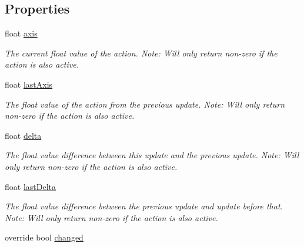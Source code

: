 \subsection*{Properties}
\begin{DoxyCompactItemize}
\item 
float \mbox{\hyperlink{class_valve_1_1_v_r_1_1_steam_v_r___action___single___source_aaf180ef56eea1ec5cf9ec08d87365312}{axis}}
\begin{DoxyCompactList}\small\item\em The current float value of the action. Note\+: Will only return non-\/zero if the action is also active. \end{DoxyCompactList}\item 
float \mbox{\hyperlink{class_valve_1_1_v_r_1_1_steam_v_r___action___single___source_a8bf67221f2e4d862277131972d0ecd69}{last\+Axis}}
\begin{DoxyCompactList}\small\item\em The float value of the action from the previous update. Note\+: Will only return non-\/zero if the action is also active. \end{DoxyCompactList}\item 
float \mbox{\hyperlink{class_valve_1_1_v_r_1_1_steam_v_r___action___single___source_a611617683e15ab0a8bba6de8a637c852}{delta}}
\begin{DoxyCompactList}\small\item\em The float value difference between this update and the previous update. Note\+: Will only return non-\/zero if the action is also active. \end{DoxyCompactList}\item 
float \mbox{\hyperlink{class_valve_1_1_v_r_1_1_steam_v_r___action___single___source_a85d7a7ecd8610d667532340eb3cc0200}{last\+Delta}}
\begin{DoxyCompactList}\small\item\em The float value difference between the previous update and update before that. Note\+: Will only return non-\/zero if the action is also active. \end{DoxyCompactList}\item 
override bool \mbox{\hyperlink{class_valve_1_1_v_r_1_1_steam_v_r___action___single___source_a665f62ee0d4069dff8f939ba854017dd}{changed}}

\end{DoxyCompactItemize}
